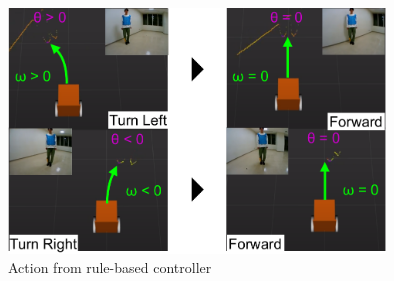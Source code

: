   \vspace{-0.5cm}

  \begin{figure}[h]
    \centering
    \includegraphics[height=6.5cm] {images/pdf/RobotGuidance_rule-based_controller}
    \captionsetup{justification=raggedright} %
    \caption{Action from rule-based controller}
    \label{Fig:Action from rule-based controller}
  \end{figure}

\newpage
